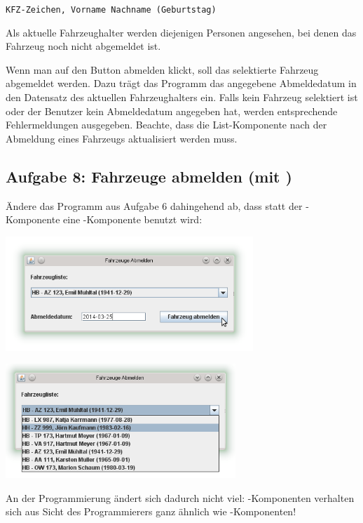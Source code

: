 \lstinline|KFZ-Zeichen, Vorname Nachname (Geburtstag)|

Als aktuelle Fahrzeughalter werden diejenigen Personen angesehen, bei denen das
Fahrzeug noch nicht abgemeldet ist. 

Wenn man auf den Button abmelden klickt, soll das selektierte Fahrzeug
abgemeldet werden. Dazu trägt das Programm das angegebene Abmeldedatum in den
Datensatz des aktuellen Fahrzeughalters ein. Falls kein Fahrzeug selektiert ist
oder der Benutzer kein Abmeldedatum angegeben hat, werden entsprechende
Fehlermeldungen ausgegeben. Beachte, dass die List-Komponente nach der
Abmeldung eines Fahrzeugs aktualisiert werden muss.


\subsection{Aufgabe 8: Fahrzeuge abmelden (mit )}

Ändere das Programm aus Aufgabe 6 dahingehend ab, dass statt der
-Komponente eine -Komponente benutzt wird:

\begin{center}
\includegraphics[width=0.7\textwidth]{./inf/SEKII/44_Abi-Training/FahrzeugeAbmeldenMitJComboBox1.png}
\end{center}

\begin{center}
\includegraphics[width=0.65\textwidth]{./inf/SEKII/44_Abi-Training/FahrzeugeAbmeldenMitJComboBox2.png}
\end{center}

An der Programmierung ändert sich dadurch nicht viel:
-Komponenten verhalten sich aus Sicht des Programmierers ganz
ähnlich wie -Komponenten!


